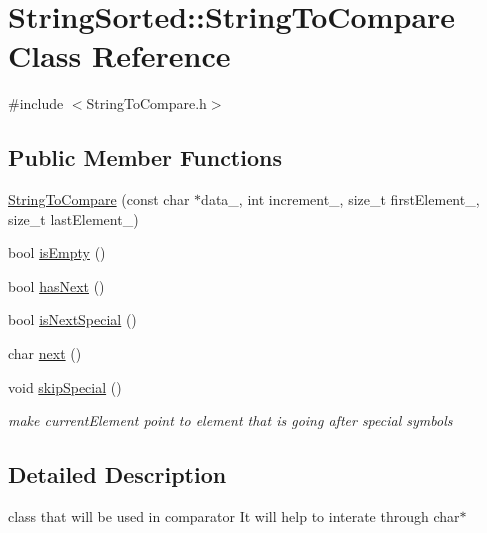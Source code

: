 \hypertarget{classStringSorted_1_1StringToCompare}{}\section{String\+Sorted\+:\+:String\+To\+Compare Class Reference}
\label{classStringSorted_1_1StringToCompare}


{\ttfamily \#include $<$String\+To\+Compare.\+h$>$}

\subsection*{Public Member Functions}
\begin{DoxyCompactItemize}
\item 
\hyperlink{classStringSorted_1_1StringToCompare_aae55688e16c82fc29aa6f91dd24f7292}{String\+To\+Compare} (const char $\ast$data\+\_\+, int increment\+\_\+, size\+\_\+t first\+Element\+\_\+, size\+\_\+t last\+Element\+\_\+)
\item 
bool \hyperlink{classStringSorted_1_1StringToCompare_a6776b71fc621a8c3d2d3d8320f4d9d8a}{is\+Empty} ()
\item 
bool \hyperlink{classStringSorted_1_1StringToCompare_ab0e3d5662e01e96218838e24c4f70f04}{has\+Next} ()
\item 
bool \hyperlink{classStringSorted_1_1StringToCompare_ae57d0863b00ea31b7a4e92b4d5d60253}{is\+Next\+Special} ()
\item 
char \hyperlink{classStringSorted_1_1StringToCompare_ac95630111cf77e6c725364bfeb26f8bc}{next} ()
\item 
\mbox{\label{classStringSorted_1_1StringToCompare_a1cfb96a9267ecd7ba618390c78278fd0}} 
void \hyperlink{classStringSorted_1_1StringToCompare_a1cfb96a9267ecd7ba618390c78278fd0}{skip\+Special} ()
\begin{DoxyCompactList}\small\item\em make current\+Element point to element that is going after special symbols \end{DoxyCompactList}\end{DoxyCompactItemize}


\subsection{Detailed Description}
class that will be used in comparator It will help to interate through char$\ast$ 

